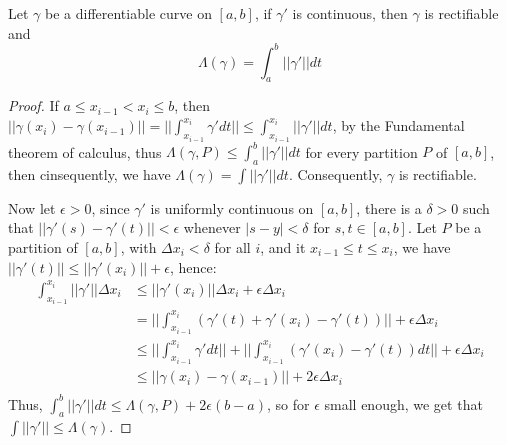 \begin{theorem}\label{7.5.1}
    Let $\gamma$ be a differentiable curve on  $[a,b]$, if  $\gamma'$ is
    continuous, then  $\gamma$ is rectifiable and
        \begin{equation}
            \Lambda(\gamma)=\int_{a}^{b}{||\gamma'|| dt}
        \end{equation}
\end{theorem}
\begin{proof}
    If $a \leq x_{i-1}<x_i \leq b$, then
    $||\gamma(x_i)-\gamma(x_{i-1})||=||\int_{x_{i-1}}^{x_i}{\gamma' dt}|| \leq
    \int_{x_{i-1}}^{x_i}{||\gamma'|| dt}$, by the Fundamental theorem of
    calculus, thus $\Lambda(\gamma,P) \leq \int_{a}^{b}{||\gamma'|| dt}$
    for every partition $P$ of  $[a,b]$, then cinsequently, we have
    $\Lambda(\gamma)=\int{||\gamma'|| dt}$. Consequently, $\gamma$ is
    rectifiable.

    Now let  $\epsilon>0$, since  $\gamma'$ is uniformly continuous on  $[a,b]$,
    there is a  $\delta>0$ such that  $||\gamma'(s)-\gamma'(t)||<\epsilon$
    whenever  $|s-y|<\delta$ for  $s,t \in [a,b]$. Let $P$ be a partition of
    $[a,b]$, with  $\Delta{x_i}<\delta$ for all  $i$, and it  $x_{i-1} \leq t
    \leq x_i$, we have  $||\gamma'(t)|| \leq ||\gamma'(x_i)||+\epsilon$, hence:
        \begin{align*}
            \int_{x_{i-1}}^{x_i}{||\gamma'||\Delta{x_i}} &\leq ||\gamma'(x_i)||\Delta{x_i}+\epsilon\Delta{x_i} \\
                &= ||\int_{x_{i-1}}^{x_i}{(\gamma'(t)+\gamma'(x_i)-\gamma'(t))}||+\epsilon\Delta{x_i} \\
                &\leq ||\int_{x_{i-1}}^{x_i}{\gamma' dt}||+||\int_{x_{i-1}}^{x_i}{(\gamma'(x_i)-\gamma'(t)) dt}||+\epsilon\Delta{x_i} \\
                & \leq ||\gamma(x_i)-\gamma(x_{i-1})||+2\epsilon\Delta{x_i} \\
        \end{align*}
    Thus, $\int_{a}^{b}{||\gamma'|| dt} \leq \Lambda(\gamma,P)+2\epsilon(b-a)$,
    so for  $\epsilon$ small enough, we get that  $\int{||\gamma'||} \leq \Lambda(\gamma)$.
\end{proof}
